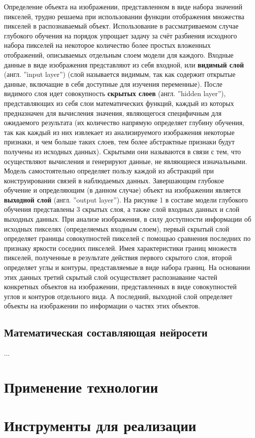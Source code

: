 \documentclass[bachelor, och, coursework]{shiza}
\begin{document}
        Определение объекта на изображении, представленном в виде набора значений пикселей, трудно решаема при использовании функции отображения множества пикселей в распознаваемый объект. Использование в рассматриваемом случае глубокого обучения на порядок упрощает задачу за счёт разбиения исходного набора пикселей на некоторое количество более простых вложенных отображений, описываемых отдельным слоем модели для каждого. Входные данные в виде изображения представляют из себя входной, или \textbf{видимый слой} (англ. ''input layer'') (слой называется видимым, так как содержит открытые данные, включащие в себя доступные для изучения переменные). После видимого слоя идет совокупность \textbf{скрытых слоев} (англ. ''hidden layer''), представляющих из себя слои математических функций, каждый из которых предназначен для вычисления значения, являющегося специфичным для ожидаемого результата (их количество напрямую определяет глубину обучения, так как каждый из них извлекает из анализируемого изображения некоторые признаки, и чем больше таких слоев, тем более абстрактные признаки будут получены из исходных данных). Скрытыми они называются в связи с тем, что осуществляют вычисления и генерируют данные, не являющиеся изначальными. Модель самостоятельно определяет пользу каждой из абстракций при конструировании связей в наблюдаемых данных. Завершающим глубокое обучение и определяющим (в данном случае) объект на изображении является \textbf{выходной слой} (англ. ''output layer''). На рисунке 1 в составе модели глубокого обучения представлены 3 скрытых слоя, а также слой входных данных и слой выходных данных. При анализе изображения, в силу доступности информации об исходных пикселях (определяемых входным слоем), первый скрытый слой определяет границы совокупностей пикселей с помощью сравнения последних по признаку яркости соседних пикселей. Имея характеристики границ множеств пикселей, полученные в результате действия первого скрытого слоя, второй определяет углы и контуры, представляемые в виде набора границ. На основании этих данных третий скрытый слой осуществляет распознавание частей конкретных объектов на изображении, представленных в виде совокупностей углов и контуров отдельного вида. А последний, выходной слой определяет объекты на изображении по информации о частях этих объектов. 

    \subsection{Математическая составляющая нейросети}
        ...
\section{Применение технологии}

    
\section{Инструменты для реализации}

\conclusion
\end{document}
